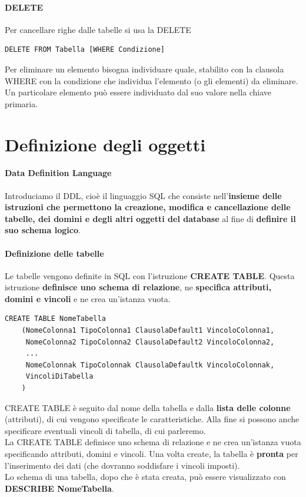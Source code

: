 \documentclass[10pt]{book}
\begin{document}
\paragraph{DELETE} Per cancellare righe dalle tabelle si usa la DELETE
\begin{lstlisting}
DELETE FROM Tabella [WHERE Condizione]
\end{lstlisting}
Per eliminare un elemento bisogna individuare quale, stabilito con la clausola WHERE con la condizione che individua l'elemento (o gli elementi) da eliminare.\\
Un particolare elemento può essere individuato dal suo valore nella chiave primaria.
\section{Definizione degli oggetti}
\paragraph{Data Definition Language} Introduciamo il DDL, cioè il linguaggio SQL che consiste nell'\textbf{insieme delle istruzioni che permettono la creazione, modifica e cancellazione delle tabelle, dei domini e degli altri oggetti del database} al fine di \textbf{definire il suo schema logico}.
\paragraph{Definizione delle tabelle} Le tabelle vengono definite in SQL con l'istruzione \textbf{CREATE TABLE}. Questa istruzione \textbf{definisce uno schema di relazione}, ne \textbf{specifica attributi, domini e vincoli} e ne crea un'istanza vuota.
\begin{lstlisting}
CREATE TABLE NomeTabella
	(NomeColonna1 TipoColonna1 ClausolaDefault1 VincoloColonna1,
	 NomeColonna2 TipoColonna2 ClausolaDefault2 VincoloColonna2,
	 ...
	 NomeColonnak TipoColonnak ClausolaDefaultk VincoloColonnak,
	 VincoliDiTabella
	)
\end{lstlisting}
CREATE TABLE è seguito dal nome della tabella e dalla \textbf{lista delle colonne} (attributi), di cui vengono specificate le caratteristiche. Alla fine si possono anche specificare eventuali vincoli di tabella, di cui parleremo.\\
La CREATE TABLE definisce uno schema di relazione e ne crea un'istanza vuota specificando attributi, domini e vincoli. Una volta create, la tabella è \textbf{pronta} per l'inserimento dei dati (che dovranno soddisfare i vincoli imposti).\\
Lo schema di una tabella, dopo che è stata creata, può essere visualizzato con \textbf{DESCRIBE NomeTabella}.
\pagebreak
\end{document}

